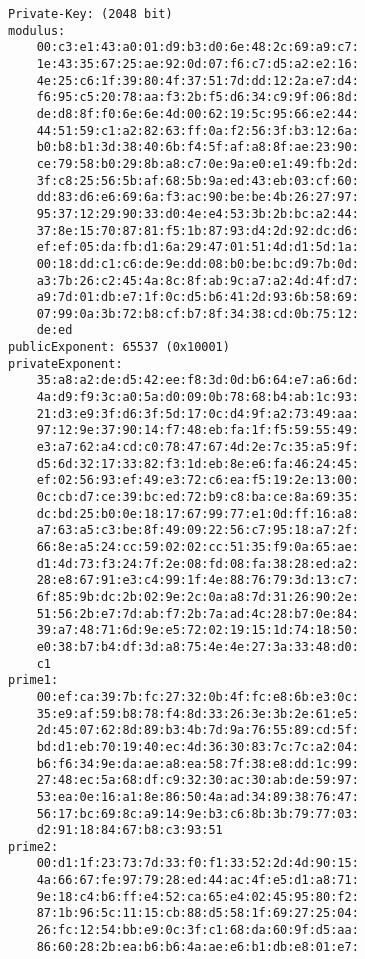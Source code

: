 {\scriptsize
\begin{Verbatim}[frame=single]
Private-Key: (2048 bit)
modulus:
    00:c3:e1:43:a0:01:d9:b3:d0:6e:48:2c:69:a9:c7:
    1e:43:35:67:25:ae:92:0d:07:f6:c7:d5:a2:e2:16:
    4e:25:c6:1f:39:80:4f:37:51:7d:dd:12:2a:e7:d4:
    f6:95:c5:20:78:aa:f3:2b:f5:d6:34:c9:9f:06:8d:
    de:d8:8f:f0:6e:6e:4d:00:62:19:5c:95:66:e2:44:
    44:51:59:c1:a2:82:63:ff:0a:f2:56:3f:b3:12:6a:
    b0:b8:b1:3d:38:40:6b:f4:5f:af:a8:8f:ae:23:90:
    ce:79:58:b0:29:8b:a8:c7:0e:9a:e0:e1:49:fb:2d:
    3f:c8:25:56:5b:af:68:5b:9a:ed:43:eb:03:cf:60:
    dd:83:d6:e6:69:6a:f3:ac:90:be:be:4b:26:27:97:
    95:37:12:29:90:33:d0:4e:e4:53:3b:2b:bc:a2:44:
    37:8e:15:70:87:81:f5:1b:87:93:d4:2d:92:dc:d6:
    ef:ef:05:da:fb:d1:6a:29:47:01:51:4d:d1:5d:1a:
    00:18:dd:c1:c6:de:9e:dd:08:b0:be:bc:d9:7b:0d:
    a3:7b:26:c2:45:4a:8c:8f:ab:9c:a7:a2:4d:4f:d7:
    a9:7d:01:db:e7:1f:0c:d5:b6:41:2d:93:6b:58:69:
    07:99:0a:3b:72:b8:cf:b7:8f:34:38:cd:0b:75:12:
    de:ed
publicExponent: 65537 (0x10001)
privateExponent:
    35:a8:a2:de:d5:42:ee:f8:3d:0d:b6:64:e7:a6:6d:
    4a:d9:f9:3c:a0:5a:d0:09:0b:78:68:b4:ab:1c:93:
    21:d3:e9:3f:d6:3f:5d:17:0c:d4:9f:a2:73:49:aa:
    97:12:9e:37:90:14:f7:48:eb:fa:1f:f5:59:55:49:
    e3:a7:62:a4:cd:c0:78:47:67:4d:2e:7c:35:a5:9f:
    d5:6d:32:17:33:82:f3:1d:eb:8e:e6:fa:46:24:45:
    ef:02:56:93:ef:49:e3:72:c6:ea:f5:19:2e:13:00:
    0c:cb:d7:ce:39:bc:ed:72:b9:c8:ba:ce:8a:69:35:
    dc:bd:25:b0:0e:18:17:67:99:77:e1:0d:ff:16:a8:
    a7:63:a5:c3:be:8f:49:09:22:56:c7:95:18:a7:2f:
    66:8e:a5:24:cc:59:02:02:cc:51:35:f9:0a:65:ae:
    d1:4d:73:f3:24:7f:2e:08:fd:08:fa:38:28:ed:a2:
    28:e8:67:91:e3:c4:99:1f:4e:88:76:79:3d:13:c7:
    6f:85:9b:dc:2b:02:9e:2c:0a:a8:7d:31:26:90:2e:
    51:56:2b:e7:7d:ab:f7:2b:7a:ad:4c:28:b7:0e:84:
    39:a7:48:71:6d:9e:e5:72:02:19:15:1d:74:18:50:
    e0:38:b7:b4:df:3d:a8:75:4e:4e:27:3a:33:48:d0:
    c1
prime1:
    00:ef:ca:39:7b:fc:27:32:0b:4f:fc:e8:6b:e3:0c:
    35:e9:af:59:b8:78:f4:8d:33:26:3e:3b:2e:61:e5:
    2d:45:07:62:8d:89:b3:4b:7d:9a:76:55:89:cd:5f:
    bd:d1:eb:70:19:40:ec:4d:36:30:83:7c:7c:a2:04:
    b6:f6:34:9e:da:ae:a8:ea:58:7f:38:e8:dd:1c:99:
    27:48:ec:5a:68:df:c9:32:30:ac:30:ab:de:59:97:
    53:ea:0e:16:a1:8e:86:50:4a:ad:34:89:38:76:47:
    56:17:bc:69:8c:a9:14:9e:b3:c6:8b:3b:79:77:03:
    d2:91:18:84:67:b8:c3:93:51
prime2:
    00:d1:1f:23:73:7d:33:f0:f1:33:52:2d:4d:90:15:
    4a:66:67:fe:97:79:28:ed:44:ac:4f:e5:d1:a8:71:
    9e:18:c4:b6:ff:e4:52:ca:65:e4:02:45:95:80:f2:
    87:1b:96:5c:11:15:cb:88:d5:58:1f:69:27:25:04:
    26:fc:12:54:bb:e9:0c:3f:c1:68:da:60:9f:d5:aa:
    86:60:28:2b:ea:b6:b6:4a:ae:e6:b1:db:e8:01:e7:

\end{Verbatim}}

